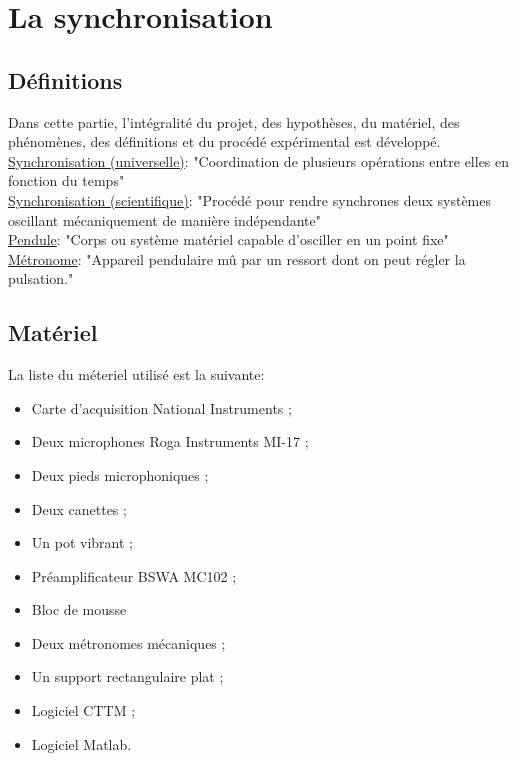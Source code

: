 \documentclass[a4paper,11pt]{report}
\begin{document}
\newpage
\null
\thispagestyle{empty}
\chapter{La synchronisation}
\section{Définitions}
Dans cette partie, l'intégralité du projet, des hypothèses, du matériel, des phénomènes, des définitions et du procédé expérimental est développé.\\
\underline{Synchronisation (universelle)}: "Coordination de plusieurs opérations entre elles en fonction du temps"\cite{wiki}\\
\underline{Synchronisation (scientifique)}: "Procédé pour rendre synchrones deux systèmes oscillant mécaniquement de manière indépendante"\cite{cntrl}\\
\underline{Pendule}: "Corps ou système matériel capable d'osciller en un point fixe"\cite{ikonet}\\
\underline{Métronome}: "Appareil pendulaire mû par un ressort dont on peut régler la pulsation."\cite{pend} \\

\section{Matériel}

La liste du méteriel utilisé est la suivante:\\
\begin{itemize}[label=\textbullet, leftmargin=* ,parsep=0cm,itemsep=0cm,topsep=0cm,font=\tiny]
\item Carte d'acquisition National Instruments ;
\item Deux microphones Roga Instruments MI-17 ;
\item Deux pieds microphoniques ;
\item Deux canettes ;
\item Un pot vibrant ;
\item Préamplificateur BSWA MC102 ;
\item Bloc de mousse
\item Deux métronomes mécaniques ;
\item Un support rectangulaire plat ;
\item Logiciel CTTM ;
\item Logiciel Matlab.
\end{itemize}
\end{document}
